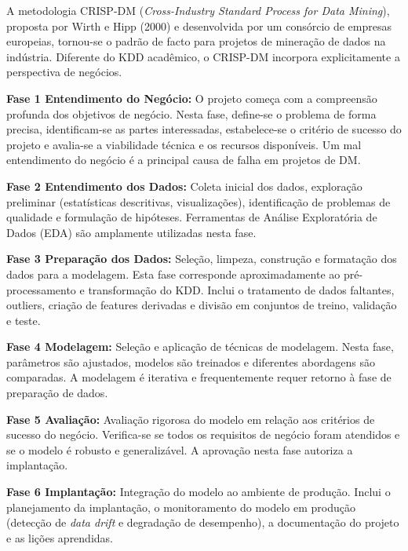 \documentclass[12pt,a4paper]{article}
\begin{document}
A metodologia CRISP-DM (\textit{Cross-Industry Standard Process for Data Mining}), proposta por Wirth e Hipp (2000) e desenvolvida por um consórcio de empresas europeias, tornou-se o padrão de facto para projetos de mineração de dados na indústria. Diferente do KDD acadêmico, o CRISP-DM incorpora explicitamente a perspectiva de negócios.

\textbf{Fase 1 Entendimento do Negócio:} O projeto começa com a compreensão profunda dos objetivos de negócio. Nesta fase, define-se o problema de forma precisa, identificam-se as partes interessadas, estabelece-se o critério de sucesso do projeto e avalia-se a viabilidade técnica e os recursos disponíveis. Um mal entendimento do negócio é a principal causa de falha em projetos de DM.

\textbf{Fase 2 Entendimento dos Dados:} Coleta inicial dos dados, exploração preliminar (estatísticas descritivas, visualizações), identificação de problemas de qualidade e formulação de hipóteses. Ferramentas de Análise Exploratória de Dados (EDA) são amplamente utilizadas nesta fase.

\textbf{Fase 3 Preparação dos Dados:} Seleção, limpeza, construção e formatação dos dados para a modelagem. Esta fase corresponde aproximadamente ao pré-processamento e transformação do KDD. Inclui o tratamento de dados faltantes, outliers, criação de features derivadas e divisão em conjuntos de treino, validação e teste.

\textbf{Fase 4 Modelagem:} Seleção e aplicação de técnicas de modelagem. Nesta fase, parâmetros são ajustados, modelos são treinados e diferentes abordagens são comparadas. A modelagem é iterativa e frequentemente requer retorno à fase de preparação de dados.

\textbf{Fase 5 Avaliação:} Avaliação rigorosa do modelo em relação aos critérios de sucesso do negócio. Verifica-se se todos os requisitos de negócio foram atendidos e se o modelo é robusto e generalizável. A aprovação nesta fase autoriza a implantação.

\textbf{Fase 6 Implantação:} Integração do modelo ao ambiente de produção. Inclui o planejamento da implantação, o monitoramento do modelo em produção (detecção de \textit{data drift} e degradação de desempenho), a documentação do projeto e as lições aprendidas.
\end{document}
